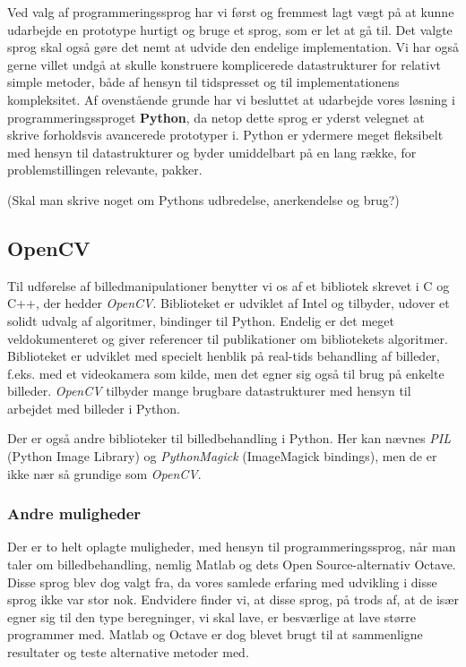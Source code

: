 {
{\sffamily Ved valg af programmeringssprog har vi først og fremmest lagt
vægt på at kunne udarbejde en prototype hurtigt og bruge et sprog, som
er let at gå til. Det valgte sprog skal også gøre det nemt at udvide den
endelige implementation. Vi har også gerne villet undgå at skulle
konstruere komplicerede datastrukturer for relativt simple metoder, både
af hensyn til tidspresset og til implementationens kompleksitet. Af
ovenstående grunde har vi besluttet at udarbejde vores løsning i
programmeringssproget \textbf{Python}, da netop dette sprog er yderst
velegnet at skrive forholdsvis avancerede prototyper i. Python er
ydermere meget fleksibelt med hensyn til datastrukturer og byder
umiddelbart på en lang række, for problemstillingen relevante, pakker.

(Skal man skrive noget om Pythons udbredelse, anerkendelse og brug?)
}

\subsection{OpenCV}
Til udførelse af billedmanipulationer benytter vi os af et bibliotek skrevet
i C og C++, der hedder \emph{OpenCV}. Biblioteket er udviklet af Intel
og tilbyder, udover et solidt udvalg af algoritmer, bindinger til
Python.  Endelig er det meget veldokumenteret og giver referencer til
publikationer om bibliotekets algoritmer. Biblioteket er udviklet med
specielt henblik på real-tids behandling af billeder, f.eks. med et
videokamera som kilde, men det egner sig også til brug på enkelte
billeder.  \emph{OpenCV} tilbyder mange brugbare datastrukturer med
hensyn til arbejdet med billeder i Python.

Der er også andre biblioteker til billedbehandling i Python. Her kan
nævnes \emph{PIL} (Python Image Library) og \emph{PythonMagick}
(ImageMagick bindings), men de er ikke nær så grundige som
\emph{OpenCV}.

\subsubsection{Andre muligheder}
Der er to helt oplagte muligheder, med hensyn til programmeringssprog,
når man taler om billedbehandling, nemlig Matlab og dets Open
Source-alternativ Octave. Disse sprog blev dog valgt fra, da vores
samlede erfaring med udvikling i disse sprog ikke var stor nok.
Endvidere finder vi, at disse sprog, på trods af, at de især egner sig
til den type beregninger, vi skal lave, er besværlige at lave større
programmer med. Matlab og Octave er dog blevet brugt til at sammenligne
resultater og teste alternative metoder med.

}
